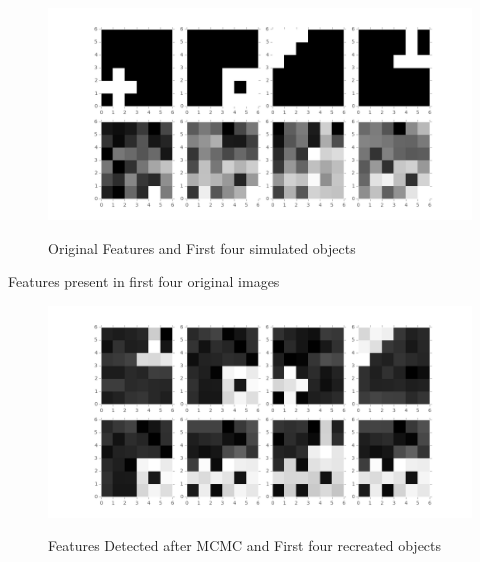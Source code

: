 \documentclass{article}
\begin{document}
\begin{figure}[ht]
\caption {Original Features and First four simulated objects}
\includegraphics[width=\linewidth]{figures/Original.png}
\label{fig:original}
\end{figure}


\begin{table}[ht]
\centering
\caption{Features present in first four original images \label{features}}

\end{table}


\begin{figure}[ht]
\caption {Features Detected after MCMC and First four recreated objects}
\includegraphics[width=\linewidth]{figures/Detected.png}
\label{fig:detected}
\end{figure}
\end{document}
